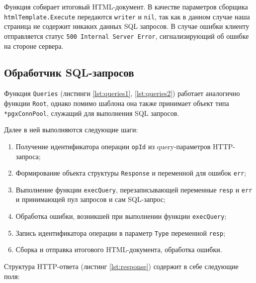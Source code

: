 Функция собирает итоговый HTML-документ.
В качестве параметров сборщика \texttt{htmlTemplate.Execute} передаются \texttt{writer} и \texttt{nil}, так как в данном
случае наша страница не содержит никаких данных SQL запросов.
В случае ошибки клиенту отправляется статус \texttt{500 Internal Server Error}, сигнализирующий об ошибке на стороне
сервера.

\subsection{Обработчик SQL-запросов}

Функция \texttt{Queries} (листинги \ref{lst:queries1}, \ref{lst:queries2}) работает аналогично функции \texttt{Root},
однако помимо шаблона она также принимает объект типа \texttt{*pgxConnPool}, служащий для выполнения SQL запросов.

\begin{listing}[H]
    \caption{Обработчик SQL-Запросов (часть 1)}
    \label{lst:queries1}
\end{listing}

\begin{listing}[H]
    \caption{Обработчик SQL-Запросов (часть 2)}
    \label{lst:queries2}
\end{listing}

Далее в ней выполняются следующие шаги:
\begin{enumerate}
    \item Получение идентификатора операции \texttt{opId} из query-параметров HTTP-запроса;
    \item Формирование объекта структуры \texttt{Response} и переменной для ошибок \texttt{err};
    \item Выполнение функции \texttt{execQuery}, перезаписывающей переменные \texttt{resp} и \texttt{err} и принимающей
    пул запросов и сам SQL-запрос;
    \item Обработка ошибки, возникшей при выполнении функции \texttt{execQuery};
    \item Запись идентификатора операции в параметр \texttt{Type} переменной \texttt{resp};
    \item Сборка и отправка итогового HTML-документа, обработка ошибки.
\end{enumerate}

Структура HTTP-ответа (листинг \ref{lst:response}) содержит в себе следующие поля:

